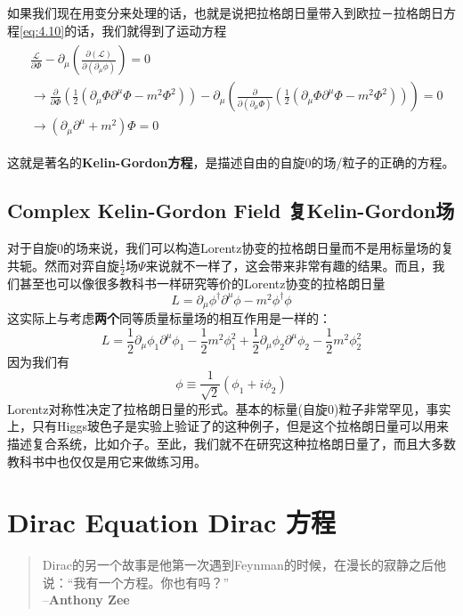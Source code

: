 如果我们现在用变分来处理的话，也就是说把拉格朗日量带入到欧拉－拉格朗日方程\eqref{eq:4.10}的话，我们就得到了运动方程
\begin{align}
\begin{split}
&\frac{\mathscr{L}}{\partial\Phi}-\partial_\mu\left(\frac{\partial(\mathscr{L})}{\partial(\partial_\mu\phi)}\right)=0\\
&\rightarrow\frac{\partial}{\partial\Phi}\left(\frac{1}{2}(\partial_\mu\Phi\partial^\mu\Phi-m^2\Phi^2)\right)-\partial_\mu\left(\frac{\partial}{\partial(\partial_\mu\Phi)}\left(\frac{1}{2}(\partial_\mu\Phi\partial^\mu\Phi-m^2\Phi^2)\right)\right)=0 \\
&\rightarrow(\partial_\mu\partial^\mu+m^2)\Phi=0
\end{split}
\end{align}

这就是著名的{\bf Kelin-Gordon方程}，是描述自由的自旋$0$的场/粒子的正确的方程。

\subsection[复Kelin-Gordon场]{Complex Kelin-Gordon Field 复Kelin-Gordon场}\label{sec6.2.1}

对于自旋$0$的场来说，我们可以构造Lorentz协变的拉格朗日量而不是用标量场的复共轭。然而对弈自旋$\frac{1}{2}$场$\Psi$来说就不一样了，这会带来非常有趣的结果。而且，我们甚至也可以像很多教科书一样研究等价的Lorentz协变的拉格朗日量
\[L=\partial_\mu\phi^\dagger\partial^\mu\phi-m^2\phi^\dagger\phi \]
这实际上与考虑{\bf 两个}同等质量标量场的相互作用是一样的：
\[L=\frac{1}{2}\partial_\mu\phi_1\partial^\mu\phi_1-\frac{1}{2}m^2\phi_1^2+\frac{1}{2}\partial_\mu\phi_2\partial^\mu\phi_2-\frac{1}{2}m^2\phi_2^2 \]
因为我们有
\[\phi\equiv\frac{1}{\sqrt2}(\phi_1+i\phi_2) \]
Lorentz对称性决定了拉格朗日量的形式。基本的标量(自旋$0$)粒子非常罕见，事实上，只有Higgs玻色子是实验上验证了的这种例子，但是这个拉格朗日量可以用来描述复合系统，比如介子。至此，我们就不在研究这种拉格朗日量了，而且大多数教科书中也仅仅是用它来做练习用。

\section[Dirac方程]{Dirac Equation Dirac 方程}\label{sec6.3}
\begin{quote}
Dirac的另一个故事是他第一次遇到Feynman的时候，在漫长的寂静之后他说：``我有一个方程。你也有吗？''\\
\phantom{Dirac的另一个故事是他第一次遇到}--{\bf Anthony Zee}
\end{quote}


